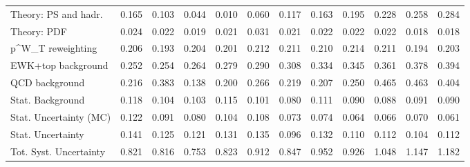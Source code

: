 \begin{tabular}{l|p{0.6cm}p{0.6cm}p{0.6cm}p{0.6cm}p{0.6cm}p{0.6cm}p{0.6cm}p{0.6cm}p{0.6cm}p{0.6cm}p{0.6cm}}
Theory: PS and hadr.                     & 0.165 & 0.103 & 0.044 & 0.010 & 0.060 & 0.117 & 0.163 & 0.195 & 0.228 & 0.258 & 0.284 \\
Theory: PDF                              & 0.024 & 0.022 & 0.019 & 0.021 & 0.031 & 0.021 & 0.022 & 0.022 & 0.022 & 0.018 & 0.018 \\
p^{W}_{T} reweighting                    & 0.206 & 0.193 & 0.204 & 0.201 & 0.212 & 0.211 & 0.210 & 0.214 & 0.211 & 0.194 & 0.203 \\
EWK+top background                       & 0.252 & 0.254 & 0.264 & 0.279 & 0.290 & 0.308 & 0.334 & 0.345 & 0.361 & 0.378 & 0.394 \\
QCD background                           & 0.216 & 0.383 & 0.138 & 0.200 & 0.266 & 0.219 & 0.207 & 0.250 & 0.465 & 0.463 & 0.404 \\
Stat. Background                         & 0.118 & 0.104 & 0.103 & 0.115 & 0.101 & 0.080 & 0.111 & 0.090 & 0.088 & 0.091 & 0.090 \\
Stat. Uncertainty (MC)                   & 0.122 & 0.091 & 0.080 & 0.104 & 0.108 & 0.073 & 0.074 & 0.064 & 0.066 & 0.070 & 0.061 \\
\hline
Stat. Uncertainty                        & 0.141 & 0.125 & 0.121 & 0.131 & 0.135 & 0.096 & 0.132 & 0.110 & 0.112 & 0.104 & 0.112 \\
\hline
Tot. Syst. Uncertainty                   & 0.821 & 0.816 & 0.753 & 0.823 & 0.912 & 0.847 & 0.952 & 0.926 & 1.048 & 1.147 & 1.182 \\
\hline
\end{tabular}
